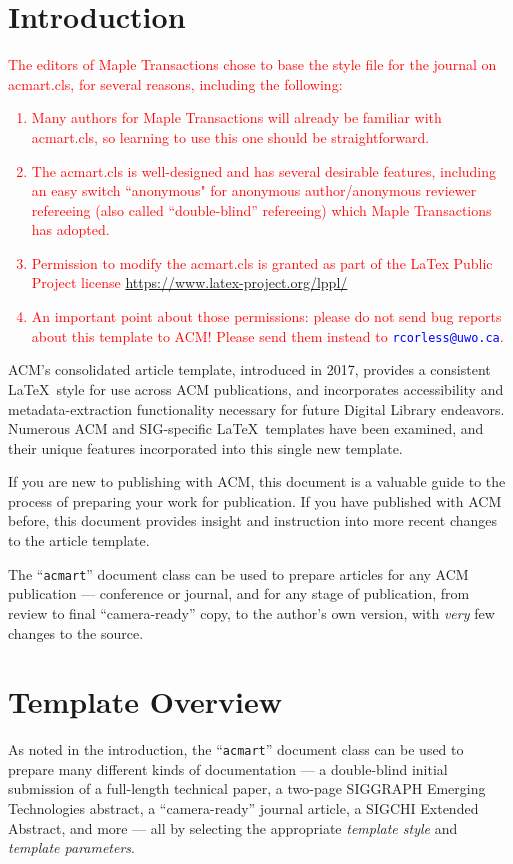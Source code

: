 \documentclass[anonymous,review,acmsmall,screen]{MapleTrans}
\begin{document}
\section{Introduction}
\textcolor{red}{The editors of Maple Transactions chose to base the style file for the journal on acmart.cls, for several reasons, including the following:
\begin{enumerate}
    \item Many authors for Maple Transactions will already be familiar with acmart.cls, so learning to use this one should be straightforward.
    \item The acmart.cls is well-designed and has several desirable features, including an easy switch ``anonymous" for anonymous author/anonymous reviewer refereeing (also called ``double-blind'' refereeing) which Maple Transactions has adopted.
    \item Permission to modify the acmart.cls is granted as part of the LaTex Public Project license \href{https://www.latex-project.org/lppl/}{https://www.latex-project.org/lppl/}
    \item An important point about those permissions: please do not send bug reports about this template to ACM!  Please send them instead to \textcolor{blue}{\texttt{rcorless@uwo.ca}}.
\end{enumerate}
}
ACM's consolidated article template, introduced in 2017, provides a
consistent \LaTeX\ style for use across ACM publications, and
incorporates accessibility and metadata-extraction functionality
necessary for future Digital Library endeavors. Numerous ACM and
SIG-specific \LaTeX\ templates have been examined, and their unique
features incorporated into this single new template.

If you are new to publishing with ACM, this document is a valuable
guide to the process of preparing your work for publication. If you
have published with ACM before, this document provides insight and
instruction into more recent changes to the article template.

The ``\verb|acmart|'' document class can be used to prepare articles
for any ACM publication --- conference or journal, and for any stage
of publication, from review to final ``camera-ready'' copy, to the
author's own version, with {\itshape very} few changes to the source.



\section{Template Overview}
As noted in the introduction, the ``\verb|acmart|'' document class can
be used to prepare many different kinds of documentation --- a
double-blind initial submission of a full-length technical paper, a
two-page SIGGRAPH Emerging Technologies abstract, a ``camera-ready''
journal article, a SIGCHI Extended Abstract, and more --- all by
selecting the appropriate {\itshape template style} and {\itshape
  template parameters}.
\end{document}
